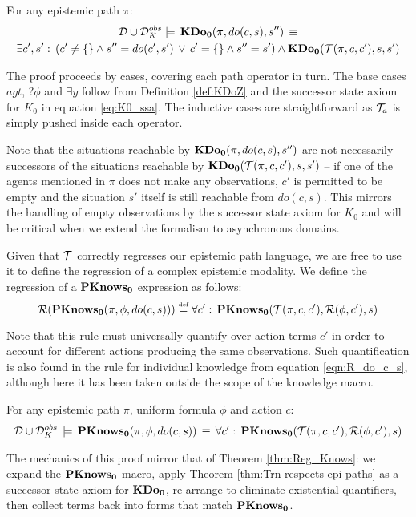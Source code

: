 \begin{thm}
\label{thm:Trn-respects-epi-paths}For any epistemic path $\pi$:\begin{multline*}
\mathcal{D}\cup\mathcal{D}_{K}^{obs}\models\,\mathbf{KDo_{0}}(\pi,do(c,s),s'')\,\equiv\\
\exists c',s':\,\left(c'\neq\{\}\wedge s''=do(c',s')\,\vee\, c'=\{\}\wedge s''=s'\right)\wedge\mathbf{KDo_{0}}(\mathcal{T}(\pi,c,c'),s,s')\end{multline*}

\end{thm}
\begin{proofsketch}
The proof proceeds by cases, covering each path operator in turn.
The base cases $agt$, $?\phi$ and $\exists y$ follow from Definition
\ref{def:KDoZ} and the successor state axiom for $K_{0}$ in equation
\eqref{eq:K0_ssa}. The inductive cases are straightforward as $\mathcal{T}_{a}$
is simply pushed inside each operator. 
\end{proofsketch}
Note that the situations reachable by $\mathbf{KDo_{0}}(\pi,do(c,s),s'')$ are
not necessarily successors of the situations reachable by $\mathbf{KDo_{0}}(\mathcal{T}(\pi,c,c'),s,s')$
-- if one of the agents mentioned in $\pi$ does not make any observations,
$c'$ is permitted to be empty and the situation $s'$ itself is still
reachable from $do(c,s)$. This mirrors the handling of empty observations
by the successor state axiom for $K_{0}$ and will be critical when
we extend the formalism to asynchronous domains.

Given that $\mathcal{T}$ correctly regresses our epistemic path language,
we are free to use it to define the regression of a complex epistemic
modality. We define the regression of a $\mathbf{PKnows_{0}}$ expression as
follows:\[
\mathcal{R}(\mathbf{PKnows_{0}}(\pi,\phi,do(c,s)))\stackrel{\mbox{\tiny def}}{=}\forall c':\,\mathbf{PKnows_{0}}(\mathcal{T}(\pi,c,c'),\mathcal{R}(\phi,c'),s)\]


Note that this rule must universally quantify over action terms $c'$
in order to account for different actions producing the same observations.
Such quantification is also found in the rule for individual knowledge
from equation \eqref{eqn:R_do_c_s}, although here it has been taken
outside the scope of the knowledge macro.

\begin{thm}
\label{thm:Reg_PKnowsZ}For any epistemic path $\pi$, uniform formula
$\phi$ and action $c$:\begin{gather*}
\mathcal{D}\cup\mathcal{D}_{K}^{obs}\,\models\,\mathbf{PKnows_{0}}(\pi,\phi,do(c,s))\,\equiv\,\forall c':\,\mathbf{PKnows_{0}}(\mathcal{T}(\pi,c,c'),\mathcal{R}(\phi,c'),s)\end{gather*}

\end{thm}
\begin{proofsketch}
The mechanics of this proof mirror that of Theorem \ref{thm:Reg_Knows}:
we expand the $\mathbf{PKnows_{0}}$ macro, apply Theorem \ref{thm:Trn-respects-epi-paths}
as a successor state axiom for $\mathbf{KDo_{0}}$, re-arrange to eliminate existential
quantifiers, then collect terms back into forms that match $\mathbf{PKnows_{0}}$. 
\end{proofsketch}

